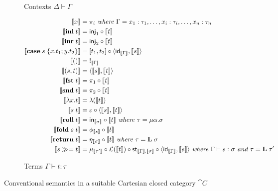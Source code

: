 \begin{figure}
\begin{subfigure}{\linewidth}
\begin{align*}
  \end{align*}
  \caption{Contexts $\Delta \vdash \Gamma$}
\end{subfigure}
\begin{subfigure}{\linewidth}
  \begin{align*}
  \small
  \llbracket x \rrbracket &= \pi_i
  \textit{ where }\Gamma = x_1: \tau_1, \ldots, x_i: \tau_i, \ldots, x_n: \tau_n
  \\
  \llbracket \mathbf{inl}\;t \rrbracket &= \mathsf{inj}_1 \circ \llbracket t \rrbracket
  \\
  \llbracket \mathbf{inr}\;t \rrbracket &= \mathsf{inj}_2 \circ \llbracket t \rrbracket
  \\
  \llbracket \mathbf{case}\;s\;\{x.t_1; y.t_2\} \rrbracket &= [t_1, t_2] \circ \langle \mathsf{id}_{\llbracket \Gamma \rrbracket}, \llbracket s \rrbracket\rangle
  \\
  \llbracket () \rrbracket &=\;!_{\llbracket \Gamma \rrbracket}
  \\
  \llbracket (s,t) \rrbracket &= \langle \llbracket s \rrbracket, \llbracket t \rrbracket\rangle
  \\
  \llbracket \mathbf{fst}\;t \rrbracket &= \pi_1 \circ \llbracket t \rrbracket
  \\
  \llbracket \mathbf{snd}\;t \rrbracket &= \pi_2 \circ \llbracket t \rrbracket
  \\
  \llbracket \lambda x.t \rrbracket &= \lambda(\llbracket t \rrbracket)
  \\
  \llbracket s\;t \rrbracket &= \varepsilon \circ \langle \llbracket s \rrbracket, \llbracket t \rrbracket\rangle
  \\
  \llbracket \mathbf{roll}\;t \rrbracket &= \mathsf{in}_{\llbracket \sigma \rrbracket} \circ \llbracket t \rrbracket
  \textit{ where }\tau = \mu\alpha.\sigma
  \\
  \llbracket \mathbf{fold}\;s\;t \rrbracket &= \phi_{\llbracket s \rrbracket} \circ \llbracket t \rrbracket
  \\
  \llbracket \mathbf{return}\;t \rrbracket &= \eta_{\llbracket \sigma \rrbracket} \circ \llbracket t \rrbracket
  \textit{ where }\tau = \mathbf{L}\;\sigma
  \\
  \llbracket {s}\gg={t} \rrbracket &= \mu_{\llbracket \tau' \rrbracket} \circ \mathcal{L}(\llbracket t \rrbracket) \circ \mathsf{st}_{\llbracket \Gamma \rrbracket,\llbracket \sigma \rrbracket} \circ \langle \mathsf{id}_{\llbracket \Gamma \rrbracket}, \llbracket s \rrbracket\rangle
  \textit{ where }\Gamma \vdash s: \sigma\textit{ and }\tau = \mathbf{L}\;\tau'
  \end{align*}
  \caption{Terms $\Gamma \vdash t: \tau$}
\end{subfigure}
\caption{Conventional semantics in a suitable Cartesian closed category $\cat{C}$}
\end{figure}
